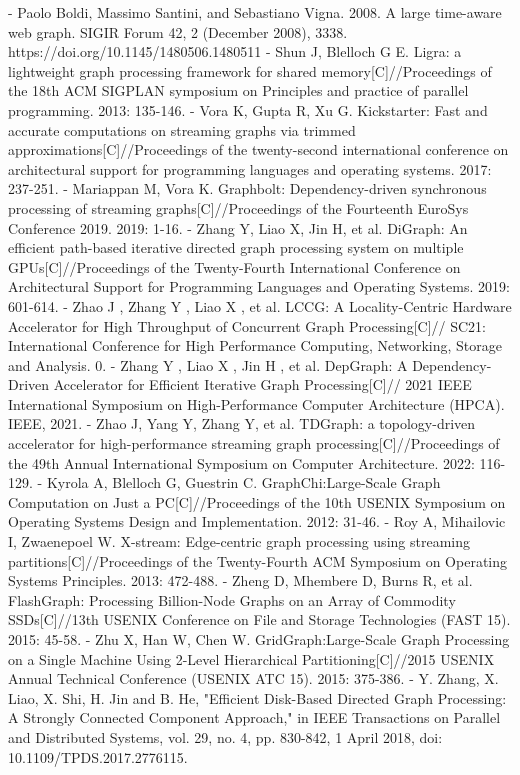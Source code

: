 \documentclass[lettersize,journal]{IEEEtran} %
\begin{document}
- Paolo Boldi, Massimo Santini, and Sebastiano Vigna. 2008. A large time-aware web graph. SIGIR Forum 42, 2 (December 2008), 3338. https://doi.org/10.1145/1480506.1480511
- Shun J, Blelloch G E. Ligra: a lightweight graph processing framework for shared memory[C]//Proceedings of the 18th ACM SIGPLAN symposium on Principles and practice of parallel programming. 2013: 135-146.
- Vora K, Gupta R, Xu G. Kickstarter: Fast and accurate computations on streaming graphs via trimmed approximations[C]//Proceedings of the twenty-second international conference on architectural support for programming languages and operating systems. 2017: 237-251.
- Mariappan M, Vora K. Graphbolt: Dependency-driven synchronous processing of streaming graphs[C]//Proceedings of the Fourteenth EuroSys Conference 2019. 2019: 1-16.
- Zhang Y, Liao X, Jin H, et al. DiGraph: An efficient path-based iterative directed graph processing system on multiple GPUs[C]//Proceedings of the Twenty-Fourth International Conference on Architectural Support for Programming Languages and Operating Systems. 2019: 601-614.
- Zhao J ,  Zhang Y ,  Liao X , et al. LCCG: A Locality-Centric Hardware Accelerator for High Throughput of Concurrent Graph Processing[C]// SC21: International Conference for High Performance Computing, Networking, Storage and Analysis. 0.
- Zhang Y , Liao X , Jin H , et al. DepGraph: A Dependency-Driven Accelerator for Efficient Iterative Graph Processing[C]// 2021 IEEE International Symposium on High-Performance Computer Architecture (HPCA). IEEE, 2021.
- Zhao J, Yang Y, Zhang Y, et al. TDGraph: a topology-driven accelerator for high-performance streaming graph processing[C]//Proceedings of the 49th Annual International Symposium on Computer Architecture. 2022: 116-129.
- Kyrola A, Blelloch G, Guestrin C. {GraphChi}:{Large-Scale} Graph Computation on Just a {PC}[C]//Proceedings of the 10th USENIX Symposium on Operating Systems Design and Implementation. 2012: 31-46.
- Roy A, Mihailovic I, Zwaenepoel W. X-stream: Edge-centric graph processing using streaming partitions[C]//Proceedings of the Twenty-Fourth ACM Symposium on Operating Systems Principles. 2013: 472-488.
- Zheng D, Mhembere D, Burns R, et al. {FlashGraph}: Processing {Billion-Node} Graphs on an Array of Commodity {SSDs}[C]//13th USENIX Conference on File and Storage Technologies (FAST 15). 2015: 45-58.
- Zhu X, Han W, Chen W. {GridGraph}:{Large-Scale} Graph Processing on a Single Machine Using 2-Level Hierarchical Partitioning[C]//2015 USENIX Annual Technical Conference (USENIX ATC 15). 2015: 375-386.
- Y. Zhang, X. Liao, X. Shi, H. Jin and B. He, "Efficient Disk-Based Directed Graph Processing: A Strongly Connected Component Approach," in IEEE Transactions on Parallel and Distributed Systems, vol. 29, no. 4, pp. 830-842, 1 April 2018, doi: 10.1109/TPDS.2017.2776115.
\end{document}
